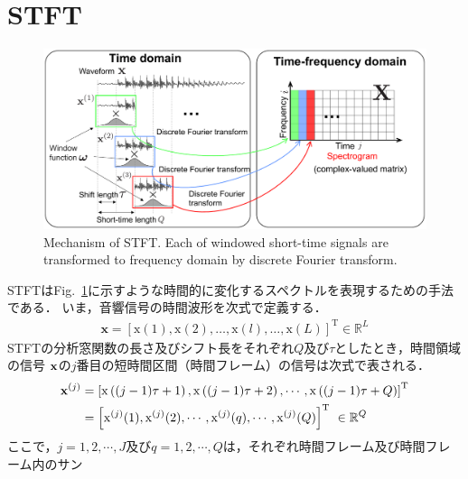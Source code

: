\section{STFT}
\label{sec:stft}
\begin{figure}[t]
    \begin{center}
        \includegraphics[width=0.95\columnwidth]{figures/stft.pdf}
    \end{center}
    \vspace{-8pt}
	\caption{Mechanism of STFT. Each of windowed short-time signals are transformed to frequency domain by discrete Fourier transform.}
	\label{fig:stft}
\end{figure}
STFTはFig.~\ref{fig:stft}に示すような時間的に変化するスペクトルを表現するための手法である．
いま，音響信号の時間波形を次式で定義する．
\begin{align}
  \mathbf{x} = [\mathrm{x}(1), \mathrm{x}(2), \dots, \mathrm{x}(l), \dots, \mathrm{x}(L)]^\mathrm{T} \in \mathbb{R}^L
\end{align}
STFTの分析窓関数の長さ及びシフト長をそれぞれ$Q$及び$\tau$としたとき，時間領域の信号
$\textcolor{black}{\mathbf{x}}$の$j$番目の短時間区間（時間フレーム）の信号は次式で表される．
\begin{align}
    \bm{\textcolor{black}{\mathbf{x}}}^{(j)} &= \left[\textcolor{black}{\mathrm{x}}\left((j-1)\tau+1\right), \textcolor{black}{\mathrm{x}}\left((j-1)\tau+2\right), \cdots , \textcolor{black}{\mathrm{x}}\left((j-1)\tau+Q\right) \right]^{\textcolor{black}{\mathrm{T}}}\\
    &= \left[
    \textcolor{black}{\mathrm{x}}^{(j)}(1),\textcolor{black}{\mathrm{x}}^{(j)}(2),\cdots , \textcolor{black}{\mathrm{x}}^{(j)}(q), \cdots , \textcolor{black}{\mathrm{x}}^{(j)}(Q)
    \right]^{\textcolor{black}{\mathrm{T}}}~\in \mathbb{R}^{Q}
\end{align}
ここで，$j= 1, 2, \cdots , J$及び$q= 1, 2, \cdots , Q$は，それぞれ時間フレーム及び時間フレーム内のサン
